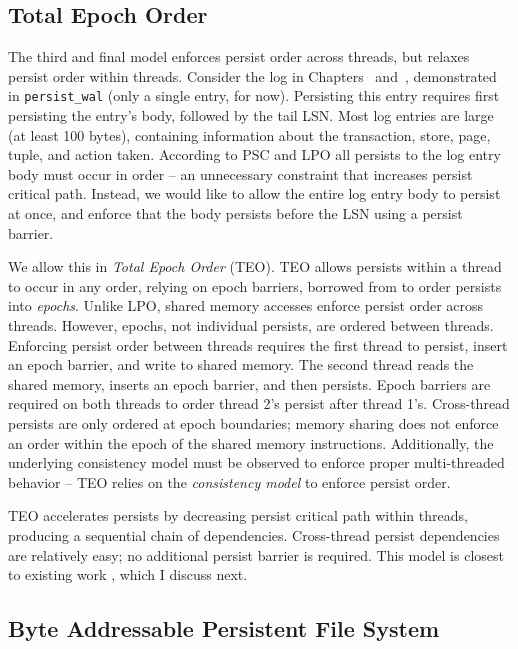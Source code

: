 \subsection{Total Epoch Order}
\label{sec:PMC:PersistenceModels:TEO}

The third and final model enforces persist order across threads, but relaxes persist order within threads.
Consider the log in Chapters~ and~, demonstrated in \texttt{persist\_wal} (only a single entry, for now).
Persisting this entry requires first persisting the entry's body, followed by the tail LSN.
Most log entries are large (at least 100 bytes), containing information about the transaction, store, page, tuple, and action taken.
According to PSC and LPO all persists to the log entry body must occur in order -- an unnecessary constraint that increases persist critical path.
Instead, we would like to allow the entire log entry body to persist at once, and enforce that the body persists before the LSN using a persist barrier.

We allow this in \emph{Total Epoch Order} (TEO).
TEO allows persists within a thread to occur in any order, relying on epoch barriers, borrowed from  to order persists into \emph{epochs}.
Unlike LPO, shared memory accesses enforce persist order across threads.
However, epochs, not individual persists, are ordered between threads.
Enforcing persist order between threads requires the first thread to persist, insert an epoch barrier, and write to shared memory.
The second thread reads the shared memory, inserts an epoch barrier, and then persists.
Epoch barriers are required on both threads to order thread 2's persist after thread 1's.
Cross-thread persists are only ordered at epoch boundaries; memory sharing does not enforce an order within the epoch of the shared memory instructions.
Additionally, the underlying consistency model must be observed to enforce proper multi-threaded behavior -- TEO relies on the \emph{consistency model} to enforce persist order.

TEO accelerates persists by decreasing persist critical path within threads, producing a sequential chain of dependencies.
Cross-thread persist dependencies are relatively easy; no additional persist barrier is required.
This model is closest to existing work , which I discuss next.

\subsection{Byte Addressable Persistent File System}
\label{sec:PMC:PersistenceModels:BPFS}

